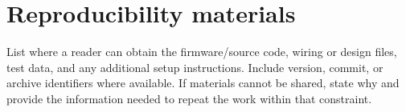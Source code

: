 \chapter*{Reproducibility materials}

List where a reader can obtain the firmware/source code, wiring or design
files, test data, and any additional setup instructions. Include version,
commit, or archive identifiers where available. If materials cannot be
shared, state why and provide the information needed to repeat the work
within that constraint.
